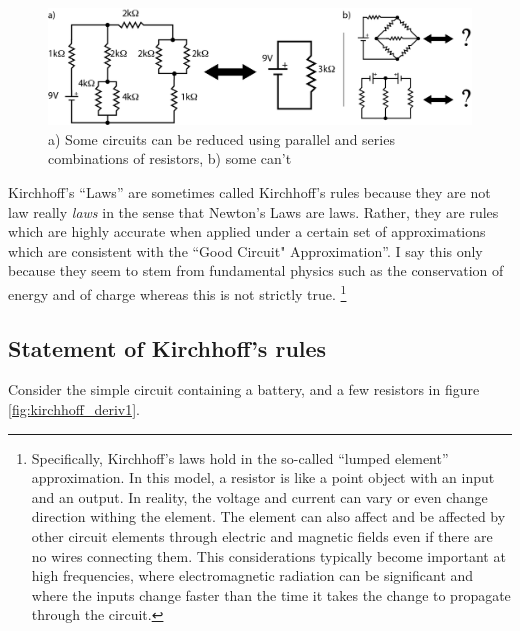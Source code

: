 \documentclass{tufte-book}
\begin{document}
\begin{figure}[h]
\caption{a) Some circuits can be reduced using parallel and series combinations of resistors, b) some can't}
\label{fig:kirchhoff_circuits}
\begin{center}
\includegraphics{kirchhoff_circuits.png}
\end{center}
\end{figure}


Kirchhoff's ``Laws'' are sometimes called Kirchhoff's rules because they are not law really \textit{laws} in the sense that Newton's Laws are laws. Rather, they are rules which are highly accurate when applied under a certain set of approximations which are consistent with the ``Good Circuit" Approximation''. I say this only because they seem to stem from fundamental physics such as the conservation of energy and of charge whereas this is not strictly true. \footnote{Specifically, Kirchhoff's laws hold in the so-called ``lumped element'' approximation. In this model, a resistor is like a point object with an input and an output. In reality, the voltage and current can vary or even change direction withing the element. The element can also affect and be affected by other circuit elements through electric and magnetic fields even if there are no wires connecting them. This considerations typically become important at high frequencies, where electromagnetic radiation can be significant and where the inputs change faster than the time it takes the change to propagate through the circuit.}

\subsection{Statement of Kirchhoff's rules}
Consider the simple circuit containing a battery, and a few resistors in figure \ref{fig:kirchhoff_deriv1}. 
\end{document}
